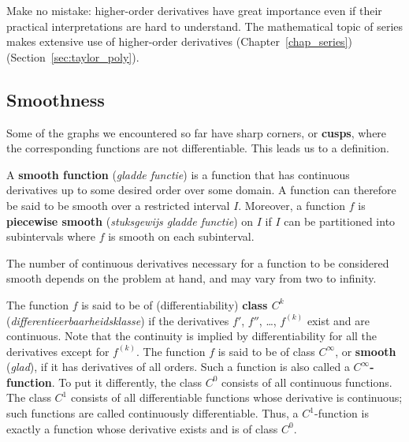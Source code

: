 Make no mistake: higher-order derivatives have great importance even if their practical interpretations are hard to understand. The mathematical topic of series makes extensive use of higher-order derivatives \ifanalysis(Chapter~\ref{chap_series})\fi\ifcalculus(Section~\ref{sec:taylor_poly})\fi.\fi



\ifcourse
\subsection{Smoothness}
Some of the graphs  we encountered so far have sharp corners, or \textbf{cusps}, where the corresponding functions are not differentiable. This leads us to a definition.

\begin{definition}[Smoothness]\label{def:smooth}
A \textbf{smooth function} (\textit{gladde functie}) is a function that has continuous derivatives up to some desired order over some domain. A function can therefore be said to be smooth over a restricted interval $I$. Moreover, a function $f$ is \textbf{piecewise smooth} (\textit{stuksgewijs gladde functie}) on $I$ if $I$ can be partitioned into subintervals where $f$ is smooth on each subinterval.
\end{definition}
	\checkoddpage
{}
The number of continuous derivatives necessary for a function to be considered smooth depends on the problem at hand, and may vary from two to infinity. 

\ifanalysis

The function $f$ is said to be of (differentiability) \textbf{class $C^k$} (\textit{differentieerbaarheidsklasse}) if the derivatives $f'$, $f''$, \ldots, $f^{(k)}$ exist and are continuous. Note that the continuity is implied by differentiability for all the derivatives except for $f^{(k)}$. The function $f$ is said to be of class $C^{\infty}$, or \textbf{smooth} (\textit{glad}), if it has derivatives of all orders. Such a function is also called a \textbf{$C^{\infty}$-function}. To put it differently, the class $C^0$ consists of all continuous functions. The class $C^1$ consists of all differentiable functions whose derivative is continuous; such functions are called continuously differentiable. Thus, a $C^1$-function is exactly a function whose derivative exists and is of class $C^0$. 


